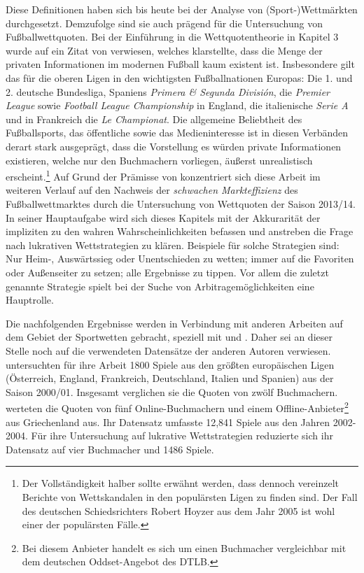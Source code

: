 Diese Definitionen haben sich bis heute bei der Analyse von (Sport-)Wettmärkten durchgesetzt. Demzufolge sind sie auch prägend für die Untersuchung von Fußballwettquoten. Bei der Einführung in die Wettquotentheorie in Kapitel 3 wurde auf ein Zitat von \citep[S. 1355]{kuypers2000information} verwiesen, welches klarstellte, dass die Menge der privaten Informationen im modernen Fußball kaum existent ist. Insbesondere gilt das für die oberen Ligen in den wichtigsten Fußballnationen Europas: Die 1. und 2. deutsche Bundesliga, Spaniens \textit{Primera \& Segunda División}, die \textit{Premier League} sowie \textit{Football League Championship} in England, die italienische \textit{Serie A} und in Frankreich die \textit{Le Championat}. Die allgemeine Beliebtheit des Fußballsports, das öffentliche sowie das Medieninteresse ist in diesen Verbänden derart stark ausgeprägt, dass die Vorstellung es würden private Informationen existieren, welche nur den Buchmachern vorliegen, äußerst unrealistisch erscheint.\footnote{Der Vollständigkeit halber sollte erwähnt werden, dass dennoch vereinzelt Berichte von Wettskandalen in den populärsten Ligen zu finden sind. Der Fall des deutschen Schiedsrichters Robert Hoyzer aus dem Jahr 2005 ist wohl einer der populärsten Fälle.} Auf Grund der Prämisse von \citeauthor{kuypers2000information} konzentriert sich diese Arbeit im weiteren Verlauf auf den Nachweis der \textit{schwachen Markteffizienz} des Fußballwettmarktes durch die Untersuchung von Wettquoten der Saison 2013/14. In seiner Hauptaufgabe wird sich dieses Kapitels mit der Akkurarität der impliziten zu den wahren Wahrscheinlichkeiten befassen und anstreben die Frage nach lukrativen Wettstrategien zu klären. Beispiele für solche Strategien sind: Nur Heim-, Auswärtssieg oder Unentschieden zu wetten; immer auf die Favoriten oder Außenseiter zu setzen; alle Ergebnisse zu tippen. Vor allem die zuletzt genannte Strategie spielt bei der Suche von Arbitragemöglichkeiten eine Hauptrolle. 

Die nachfolgenden Ergebnisse werden in Verbindung mit anderen Arbeiten auf dem Gebiet der Sportwetten gebracht, speziell mit \citet{kossmeier2008efficiency} und \citet{vlastakis2009efficient}. Daher sei an dieser Stelle noch auf die verwendeten Datensätze der anderen Autoren verwiesen. \citeauthor{kossmeier2008efficiency} untersuchten für ihre Arbeit 1800 Spiele aus den größten europäischen Ligen (Österreich, England, Frankreich, Deutschland, Italien und Spanien) aus der Saison 2000/01. Insgesamt verglichen sie die Quoten von zwölf Buchmachern. \citeauthor{vlastakis2009efficient} werteten die Quoten von fünf Online-Buchmachern und einem Offline-Anbieter\footnote{Bei diesem Anbieter handelt es sich um einen Buchmacher vergleichbar mit dem deutschen Oddset-Angebot des DTLB.} aus Griechenland aus. Ihr Datensatz umfasste  12,841 Spiele aus den Jahren 2002-2004. Für ihre Untersuchung auf lukrative Wettstrategien reduzierte sich ihr Datensatz auf vier Buchmacher und 1486 Spiele.


